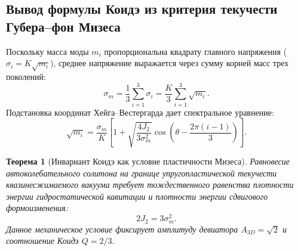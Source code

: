 \documentclass[11pt,a4paper]{article}
\newtheorem{theorem}{Теорема}[section]
\theoremstyle{definition}
\theoremstyle{remark}
\begin{document}
\subsection{Вывод формулы Коидэ из критерия текучести Губера--фон Мизеса}
Поскольку масса моды $m_i$ пропорциональна квадрату главного напряжения ($\sigma_i = K \sqrt{m_i}$), среднее напряжение выражается через сумму корней масс трех поколений:
\begin{equation}
    \sigma_m = \frac{1}{3} \sum_{i=1}^3 \sigma_i = \frac{K}{3} \sum_{i=1}^3 \sqrt{m_i}.
\end{equation}
Подстановка координат Хейга--Вестергарда дает спектральное уравнение:
\begin{equation}
    \sqrt{m_i} = \frac{\sigma_m}{K} \left[ 1 + \sqrt{\frac{4 J_2}{3 \sigma_m^2}} \cos\left( \theta - \frac{2\pi(i-1)}{3} \right) \right].
    \label{eq:koide_spectral}
\end{equation}

\begin{theorem}[Инвариант Коидэ как условие пластичности Мизеса]
Равновесие автоколебательного солитона на границе упругопластической текучести квазинесжимаемого вакуума требует тождественного равенства плотности энергии гидростатической кавитации и плотности энергии сдвигового формоизменения:
\begin{equation}
    2 J_2 = 3 \sigma_m^2.
    \label{eq:mises_balance}
\end{equation}
Данное механическое условие фиксирует амплитуду девиатора $A_{3D} = \sqrt{2}$ и соотношение Коидэ $Q = 2/3$.
\end{theorem}
\end{document}
